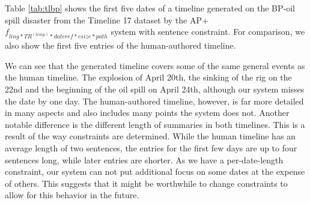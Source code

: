 \documentclass[a4paper,BCOR=10mm]{report}
\numberwithin{lemma}{chapter}
\numberwithin{definition}{chapter}
\begin{document}

Table \ref{tab:tlbp} shows the first five dates of a timeline generated on the BP-oil spill disaster from the Timeline 17 dataset by the AP+$f_{ ling*TR^{(temp)}*\mathit{dateref}*\mathit{csize}*\mathit{path} }$ system with sentence constraint.
For comparison, we also show the first five entries of the human-authored timeline.

We can see that the generated timeline covers some of the same general events as the human timeline.
The explosion of April 20th, the sinking of the rig on the 22nd and the beginning of the oil spill on April 24th, although our system misses the date by one day. The human-authored timeline, however, is far more detailed in many aspects and also includes many points the system does not.
Another notable difference is the different length of summaries in both timelines. This is a result of the way constraints are determined. While the human timeline has an average length of two sentences, the entries for the first few days are up to four sentences long, while later entries are shorter.
As we have a per-date-length constraint, our system can not put additional focus on some dates at the expense of others. This suggests that it might be worthwhile to change constraints to allow for this behavior in the future.
\end{document}
